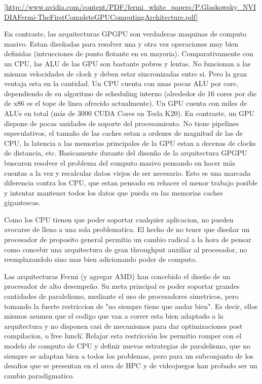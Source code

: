 \ref{http://www.nvidia.com/content/PDF/fermi_white_papers/P.Glaskowsky_NVIDIAFermi-TheFirstCompleteGPUComputingArchitecture.pdf}

En contraste, las arquitecturas GPGPU son verdaderas maquinas de computo masivo. Estan dise\~nadas para
resolver una y otra vez operaciones muy bien definidas (intrucciones de punto flotante en su mayoria).
Comparativamente con un CPU, las ALU de las GPU son bastante pobres y lentas. No funcionan a las mismas 
velocidades de clock y deben estar sincronizadas entre si. Pero la gran ventaja esta en la cantidad. 
Un CPU cuenta con unas pocas ALU por core, dependiendo de su algoritmo de scheduling interno 
(alrededor de 16 cores por die de x86 es el tope de linea ofrecido actualmente). Un GPU cuenta con miles de ALUs en total 
(m\'as de 3000 CUDA Cores en Tesla K20). 
En contraste, un GPU dispone de pocas unidades de soporte del procesamiento. No tiene pipelines especulativos, el tama\~no de las caches
estan a ordenes de magnitud de las de CPU, la latencia a las memorias principales de la GPU estan a 
decenas de clocks de distancia, etc. Basicamente durante del disen\~no de la arquitectura GPGPU
buscaron resolver el problema del computo masivo pensando en hacer m\'as cuentas a la vez y 
recalcular datos viejos de ser necesario. Esto es una marcada diferencia contra los CPU, que estan
pensado en rehacer el menor trabajo posible y intentar mantener todos los datos que pueda en 
las memorias caches gigantescas.
 
Como los CPU tienen que poder soportar cualquier aplicacion, no pueden avocarse de lleno a una sola
problematica. El hecho de no tener que dise\~nar un procesador de proposito general permitio un cambio radical
a la hora de pensar como concebir una arquitectura de gran throughput auxiliar al procesador, no reemplazandolo
sino mas bien adicionando poder de computo.

Las arquitecturas Fermi (y agregar AMD) han concebido el dise\~no de un procesador de alto desempe\~no. 
Su meta principal es poder soportar grandes cantidades de paralelismo, mediante el uso de procesadores
simetricos, pero tomando la fuerte restriccion de "no siempre tiene que andar bien". Es decir, ellos
mismos asumen que el codigo que van a correr esta bien adaptado a la arquitectura y no disponen
casi de mecanismos para dar optimizaciones post compilacion, o \"free lunch\". Relajar esta restricci\'on 
les permitio romper con el modelo de computo de CPU y definir nuevas estrategias de paralelismo, 
que no siempre se adaptan bien a todos los problemas, pero para un subconjunto de los desafios que se 
presentan en el area de HPC y de videojuegos han probado ser un cambio paradigmatico.

